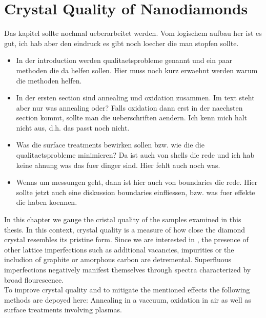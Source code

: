 
\chapter{Crystal Quality of Nanodiamonds}	\label{ch::crystal_quality}

\begin{remark}
		Das kapitel sollte nochmal ueberarbeitet werden. Vom logischem aufbau her ist es gut, ich hab aber den eindruck es gibt noch loecher die man stopfen sollte.

		\begin{itemize}
			\item In der introduction werden qualitaetsprobleme genannt und ein paar methoden die da helfen sollen. Hier muss noch kurz erwaehnt werden warum die methoden helfen.
			\item In der ersten section sind annealing und oxidation zusammen. Im text steht aber nur was annealing oder? Falls oxidation dann erst in der naechsten section kommt, sollte man die ueberschriften aendern. Ich kenn mich halt nicht aus, d.h. das passt noch nicht.
			\item Was die surface treatments bewirken sollen bzw. wie die die qualitaetsprobleme minimieren? Da ist auch von shells die rede und ich hab keine ahnung was das fuer dinger sind. Hier fehlt auch noch was.
			\item Wenns um \TEM messungen geht, dann ist hier auch von \nd boundaries die rede. Hier sollte jetzt auch eine diskussion boundaries einfliessen, bzw. was fuer effekte die haben koennen.
		\end{itemize}

\end{remark}

In this chapter we gauge the cristal quality of the \nd samples examined in this thesis. In this context, crystal quality is a measure of how close the diamond crystal resembles its pristine form. Since we are interested in \sivs, the presence of other lattice imperfections such as additional vacancies, impurities or the includion of graphite or amorphous carbon are detremental. Superfluous imperfections negatively manifest themselves through \pl spectra characterized by broad \bkg flourescence.
\\
To improve crystal quality and to mitigate the mentioned effects the following methods are depoyed here: Annealing in a vaccuum, oxidation in air as well as surface treatments involving plasmas.

